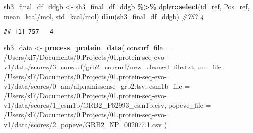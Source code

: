 \documentclass[
]{article}
\newenvironment{Shaded}{\begin{snugshade}}{\end{snugshade}}
\newcommand{\AttributeTok}[1]{\textcolor[rgb]{0.13,0.29,0.53}{#1}}
\newcommand{\CommentTok}[1]{\textcolor[rgb]{0.56,0.35,0.01}{\textit{#1}}}
\newcommand{\FunctionTok}[1]{\textcolor[rgb]{0.13,0.29,0.53}{\textbf{#1}}}
\newcommand{\NormalTok}[1]{#1}
\newcommand{\OtherTok}[1]{\textcolor[rgb]{0.56,0.35,0.01}{#1}}
\newcommand{\SpecialCharTok}[1]{\textcolor[rgb]{0.81,0.36,0.00}{\textbf{#1}}}
\newcommand{\StringTok}[1]{\textcolor[rgb]{0.31,0.60,0.02}{#1}}
\begin{document}
\begin{Shaded}
\begin{Highlighting}[]
\NormalTok{sh3\_final\_df\_ddgb }\OtherTok{\textless{}{-}}\NormalTok{ sh3\_final\_df\_ddgb }\SpecialCharTok{\%\textgreater{}\%}\NormalTok{ dplyr}\SpecialCharTok{::}\FunctionTok{select}\NormalTok{(id\_ref, Pos\_ref, }\StringTok{\textasciigrave{}}\AttributeTok{mean\_kcal/mol}\StringTok{\textasciigrave{}}\NormalTok{, }\StringTok{\textasciigrave{}}\AttributeTok{std\_kcal/mol}\StringTok{\textasciigrave{}}\NormalTok{)}
\FunctionTok{dim}\NormalTok{(sh3\_final\_df\_ddgb) }\CommentTok{\#757   4}
\end{Highlighting}
\end{Shaded}

\begin{verbatim}
## [1] 757   4
\end{verbatim}

\begin{Shaded}
\begin{Highlighting}[]
\NormalTok{sh3\_data }\OtherTok{\textless{}{-}} \FunctionTok{process\_protein\_data}\NormalTok{(}
  \AttributeTok{consurf\_file =} \StringTok{\textquotesingle{}/Users/xl7/Documents/0.Projects/01.protein{-}seq{-}evo{-}v1/data/scores/3\_consurf/grb2\_consurf/new\_cleaned\_file.txt\textquotesingle{}}\NormalTok{,}
  \AttributeTok{am\_file =} \StringTok{\textquotesingle{}/Users/xl7/Documents/0.Projects/01.protein{-}seq{-}evo{-}v1/data/scores/0\_am/alphamissense\_grb2.tsv\textquotesingle{}}\NormalTok{,}
  \AttributeTok{esm1b\_file =} \StringTok{\textquotesingle{}/Users/xl7/Documents/0.Projects/01.protein{-}seq{-}evo{-}v1/data/scores/1\_esm1b/GRB2\_P62993\_esm1b.csv\textquotesingle{}}\NormalTok{,}
  \AttributeTok{popeve\_file =} \StringTok{\textquotesingle{}/Users/xl7/Documents/0.Projects/01.protein{-}seq{-}evo{-}v1/data/scores/2\_popeve/GRB2\_NP\_002077.1.csv\textquotesingle{}}
\NormalTok{)}
\end{Highlighting}
\end{Shaded}
\end{document}
